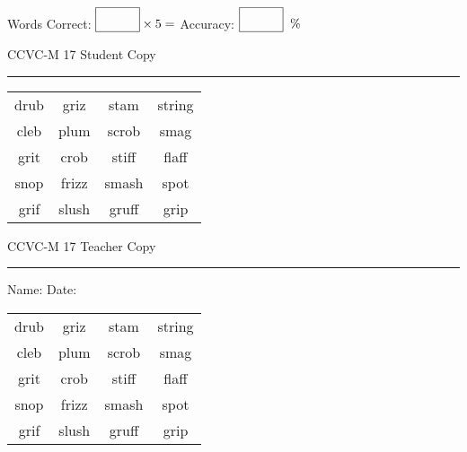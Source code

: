 \documentclass{memoir}
\begin{document}
\small

Words Correct: $\fbox{\phantom{\huge 100}} \times 5 = $ Accuracy: $\fbox{\phantom{\huge 100}}\;\; \%$ 

\vfill

\newpage


\footnotesize \noindent
CCVC-M 17 \hfill Student Copy
\smallskip
\hrule

\Large

\setlength{\tabcolsep}{14pt}
\def\arraystretch{3}

{\selectfont


\begin{vplace}[0.5]
\begin{center}
\begin{tabular}{cccc}
drub             & griz & stam            & string \\
cleb & plum & scrob & smag \\
grit      & crob & stiff & flaff \\
snop & frizz & smash & spot \\
grif      & slush & gruff & grip      \\
\end{tabular}
\end{center}
\end{vplace}

}

\newpage

\footnotesize \noindent
CCVC-M 17 \hfill Teacher Copy
\smallskip
\hrule

\small

\vfill

\noindent
Name: \underline{\hspace{1.75in}} \hfill Date: \underline{\hspace{1in}}

\Large

{\selectfont


\begin{vplace}[0.5]
\begin{center}
\begin{tabular}{cccc}
drub             & griz & stam            & string \\
cleb & plum & scrob & smag \\
grit      & crob & stiff & flaff \\
snop & frizz & smash & spot \\
grif      & slush & gruff & grip      \\
\end{tabular}
\end{center}
\end{vplace}



}
\end{document}
